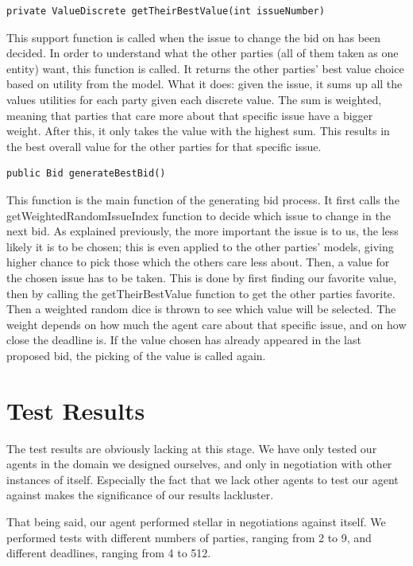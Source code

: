 \documentclass[a4,11pt]{scrartcl}
\begin{document}
\begin{lstlisting}
private ValueDiscrete getTheirBestValue(int issueNumber)
\end{lstlisting}
This support function is called when the issue to change the bid on has been decided. In order to understand what the other parties (all of them taken as one entity) want, this function is called. It returns the other parties' best value choice based on utility from the model. What it does: given the issue, it sums up all the values utilities for each party given each discrete value. The sum is weighted, meaning that parties that care more about that specific issue have a bigger weight. After this, it only takes the value with the highest sum. This results in the best overall value for the other parties for that specific issue.  
\begin{lstlisting}
public Bid generateBestBid()
\end{lstlisting}
This function is the main function of the generating bid process. It first calls the getWeightedRandomIssueIndex function to decide which issue to change in the next bid. As explained previously, the more important the issue is to us, the less likely it is to be chosen; this is even applied to the other parties' models, giving higher chance to pick those which the others care less about. 
Then, a value for the chosen issue has to be taken. This is done by first finding our favorite value, then by calling the getTheirBestValue function to get the other parties favorite. Then a weighted random dice is thrown to see which value will be selected. The weight depends on how much the agent care about that specific issue, and on how close the deadline is. If the value chosen has already appeared in the last proposed bid, the picking of the value is called again.   



\section{Test Results}\label{results}
The test results are obviously lacking at this stage. We have only
tested our agents in the domain we designed ourselves, and only in
negotiation with other instances of itself. Especially the fact that we
lack other agents to test our agent against makes the significance of
our results lackluster.

That being said, our agent performed stellar in negotiations against 
itself. We performed tests with different numbers of parties, ranging
from 2 to 9, and different deadlines, ranging from 4 to 512.
\end{document}
